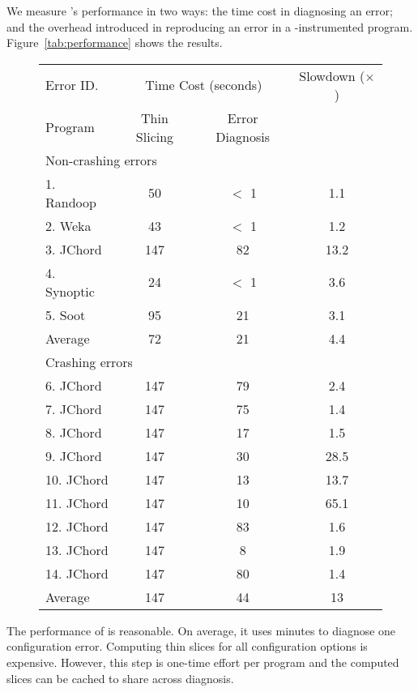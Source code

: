 We measure \ourtool's performance in two ways: the time cost
in diagnosing an error; and the overhead introduced
in reproducing an error in a \ourtool-instrumented program.  Figure~\ref{tab:performance}
shows the results.

\begin{figure}[t]
\setlength{\tabcolsep}{.94\tabcolsep}
\small{
\begin{tabular}{|l|c|c|c|}
\hline
 Error ID. & \multicolumn{2}{|c|}{Time Cost (seconds)} & Slowdown ($\times$)\\
\cline{2-3}
 Program & Thin Slicing & Error Diagnosis &  \\
 \hline
\hline
\multicolumn{4}{|l|}{Non-crashing errors}   \\
 \hline
 1. Randoop & 50 & $<$ 1 & 1.1\\
 2. Weka & 43 & $<$ 1 & 1.2 \\
 3. JChord & 147 & 82 & 13.2\\
 4. Synoptic & 24 & $<$ 1 & 3.6 \\
 5. Soot & 95 & 21 & 3.1 \\
\hline
Average & 72 & 21 & 4.4\\
\hline
\hline
\multicolumn{4}{|l|}{Crashing errors}   \\
\hline
 6. JChord & 147 & 79 & 2.4\\
 7. JChord & 147 & 75 & 1.4\\
 8. JChord & 147 & 17 &1.5\\
 9. JChord & 147 & 30 & 28.5\\
 10. JChord & 147 & 13 &13.7\\
 11. JChord & 147 & 10 &65.1 \\
 12. JChord & 147 & 83 &1.6\\
 13. JChord & 147 & 8 &1.9\\
 14. JChord & 147 & 80 &1.4\\
\hline
Average & 147 & 44 & 13\\
\hline
\end{tabular}
}
\end{figure}

The performance of \ourtool is reasonable.
On average, it uses \avgtime minutes to
diagnose one configuration error. Computing
thin slices for all configuration options
is expensive. However, this step is one-time effort
per program and the computed slices can be cached
to share across diagnosis. %

